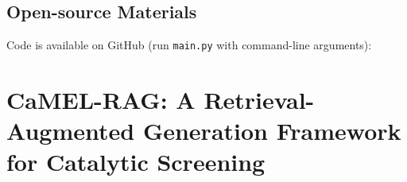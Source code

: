 \vspace{-0.3\baselineskip}
\subsection*{Open-source Materials}
Code is available on GitHub (run \texttt{main.py} with command-line arguments): 









\section{CaMEL-RAG: A Retrieval-Augmented Generation Framework for Catalytic Screening}

